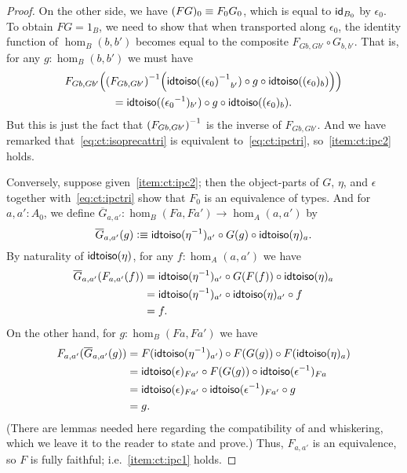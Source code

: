 \documentclass[hott-all.tex]{subfiles}
\begin{document}
\begin{proof}
  On the other side, we have $(FG)_0\jdeq F_0 G_0$, which is equal to $\idfunc[B_0]$ by $\epsilon_0$.
  To obtain $FG=1_B$, we need to show that when transported along $\epsilon_0$, the identity function of $\hom_B(b,b')$ becomes equal to the composite $F_{Gb,Gb'} \circ G_{b,b'}$.
  That is, for any $g:\hom_B(b,b')$ we must have
  \begin{multline*}
    F_{Gb,Gb'}\Big(\inv{(F_{Gb,Gb'})}\Big(\idtoiso(\opp{(\epsilon_0)}_{b'}) \circ g \circ \idtoiso((\epsilon_0)_b)\Big)\Big)\\
    = \idtoiso((\opp{\epsilon_0})_{b'}) \circ g \circ \idtoiso((\epsilon_0)_b).
  \end{multline*}
  But this is just the fact that $\inv{(F_{Gb,Gb'})}$ is the inverse of $F_{Gb,Gb'}$.
  And we have remarked that~\eqref{eq:ct:isoprecattri} is equivalent to~\eqref{eq:ct:ipctri}, so~\ref{item:ct:ipc2} holds.

  Conversely, suppose given~\ref{item:ct:ipc2}; then the object-parts of $G$, $\eta$, and $\epsilon$ together with~\eqref{eq:ct:ipctri} show that $F_0$ is an equivalence of types.
  And for $a,a':A_0$, we define $\overline{G}_{a,a'}: \hom_B(Fa,Fa') \to \hom_A(a,a')$ by
  \begin{equation}
    \overline{G}_{a,a'}(g) \defeq \idtoiso(\opp{\eta})_{a'} \circ G(g) \circ \idtoiso(\eta)_a.\label{eq:ct:gbar}
  \end{equation}
  By naturality of $\idtoiso(\eta)$, for any $f:\hom_A(a,a')$ we have
  \begin{align*}
    \overline{G}_{a,a'}(F_{a,a'}(f))
    &= \idtoiso(\opp{\eta})_{a'} \circ G(F(f)) \circ \idtoiso(\eta)_a\\
    &= \idtoiso(\opp{\eta})_{a'} \circ \idtoiso(\eta)_{a'} \circ f \\
    &= f.
  \end{align*}
  On the other hand, for $g:\hom_B(Fa,Fa')$ we have
  \begin{align*}
    F_{a,a'}(\overline{G}_{a,a'}(g))
    &= F(\idtoiso(\opp{\eta})_{a'}) \circ F(G(g)) \circ F(\idtoiso(\eta)_a)\\
    &= \idtoiso(\epsilon)_{Fa'}
    \circ F(G(g))
    \circ \idtoiso(\opp{\epsilon})_{Fa}\\
    &= \idtoiso(\epsilon)_{Fa'}
    \circ \idtoiso(\opp{\epsilon})_{Fa'}
    \circ g\\
    &= g.
  \end{align*}
  (There are lemmas needed here regarding the compatibility of \idtoiso and whiskering, which we leave it to the reader to state and prove.)
  Thus, $F_{a,a'}$ is an equivalence, so $F$ is fully faithful; i.e.~\ref{item:ct:ipc1} holds.


\end{proof}
\end{document}
